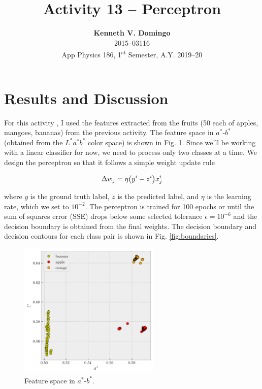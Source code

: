 \documentclass[12pt,a4paper]{article}
\newcommand{\activity}{Activity 13 -- Perceptron}
\begin{document}
\title{\TitleFont \activity}
\author[ ]{\textbf{Kenneth V. Domingo} \\
2015--03116 \\
App Physics 186, 1\textsuperscript{st} Semester, A.Y. 2019--20}

\maketitle
\thispagestyle{titlestyle}

\section*{Results and Discussion}
\setcounter{section}{1}

For this activity \cite{soriano}, I used the features extracted from the fruits (50 each of apples, mangoes, bananas) from the previous activity. The feature space in $a^*$-$b^*$ (obtained from the $L^*a^*b^*$ color space) is shown in Fig. \ref{fig:ab-space}. Since we'll be working with a linear classifier for now, we need to process only two classes at a time. We design the perceptron so that it follows a simple weight update rule

\begin{equation}\label{eq:weight-update}
	\Delta w_j = \eta \qty(y^i - z^i)x_j^i
\end{equation}

\noindent where $y$ is the ground truth label, $z$ is the predicted label, and $\eta$ is the learning rate, which we set to $10^{-2}$. The perceptron is trained for 100 epochs or until the sum of squares error (SSE) drops below some selected tolerance $\epsilon = 10^{-6}$ and the decision boundary is obtained from the final weights. The decision boundary and decision contours for each class pair is shown in Fig. \ref{fig:boundaries}.

\begin{figure}[htb]
	\centering
	\includegraphics[width=0.6\textwidth]{ab-space.png}
	\caption{Feature space in $a^*$-$b^*$.}
	\label{fig:ab-space}
\end{figure}
\end{document}
